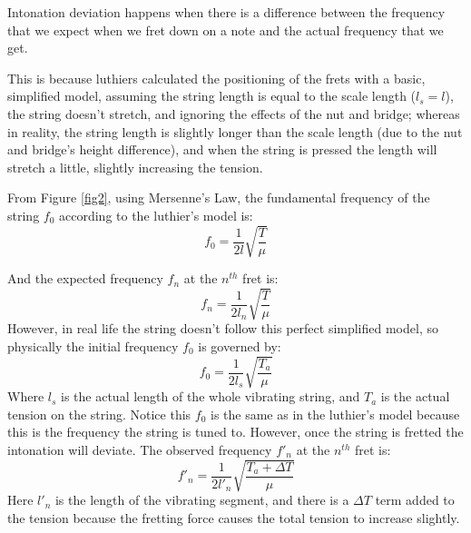 Intonation deviation happens when there is a difference between the frequency that we expect when we fret down on a note and the actual frequency that we get.

This is because luthiers calculated the positioning of the frets with a basic, simplified model, assuming the string length is equal to the scale length ($l_s = l$), the string doesn't stretch, and ignoring the effects of the nut and bridge; whereas in reality, the string length is slightly longer than the scale length (due to the nut and bridge's height difference), and when the string is pressed the length will stretch a little, slightly increasing the tension. 

From Figure \ref{fig2}, using Mersenne's Law, the fundamental frequency of the string $f_0$ according to the luthier's model is:
\begin{equation} \label{eqn3}
    f_0 = \frac{1}{2l}\sqrt{\frac{T}{\mu}}
\end{equation} 

And the expected frequency $f_n$ at the $n^{th}$ fret is: 
\begin{equation} \label{eqn4}
    f_n = \frac{1}{2l_n}\sqrt{\frac{T}{\mu}}
\end{equation}
However, in real life the string doesn't follow this perfect simplified model, so physically the initial frequency $f_0$ is governed by:
\begin{equation} \label{eqn5}
    f_0 = \frac{1}{2l_s}\sqrt{\frac{T_a}{\mu}}
\end{equation}
Where $l_s$ is the actual length of the whole vibrating string, and $T_a$ is the actual tension on the string. Notice this $f_0$ is the same as in the luthier's model because this is the frequency the string is tuned to. However, once the string is fretted the intonation will deviate. The observed frequency $f'_n$ at the $n^{th}$ fret is: 
\begin{equation} \label{eqn6}
    f'_n = \frac{1}{2l'_n}\sqrt{\frac{T_a + \Delta T}{\mu}}
\end{equation}
Here $l'_n$ is the length of the vibrating segment, and there is a $\Delta T$ term added to the tension because the fretting force causes the total tension to increase slightly. 

